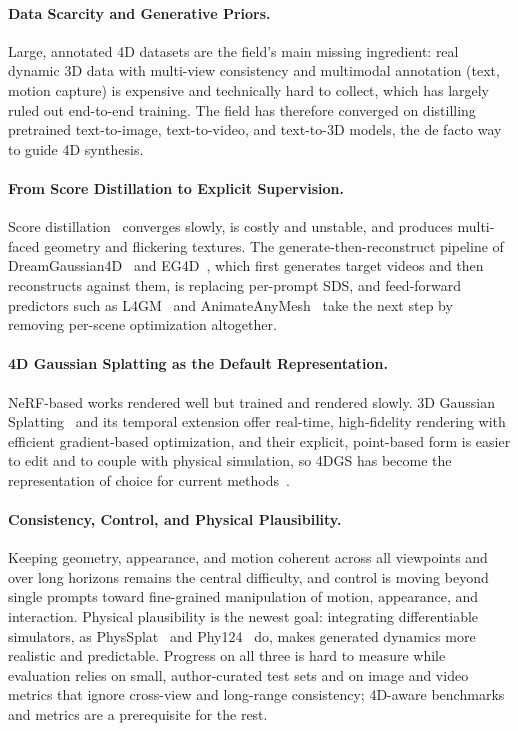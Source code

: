 \paragraph{Data Scarcity and Generative Priors.}
Large, annotated 4D datasets are the field's main missing ingredient: real dynamic 3D data with multi-view consistency and multimodal annotation (text, motion capture) is expensive and technically hard to collect, which has largely ruled out end-to-end training. The field has therefore converged on distilling pretrained text-to-image, text-to-video, and text-to-3D models, the de facto way to guide 4D synthesis.

\paragraph{From Score Distillation to Explicit Supervision.}
Score distillation~\cite{poole2022dreamfusion} converges slowly, is costly and unstable, and produces multi-faced geometry and flickering textures. The generate-then-reconstruct pipeline of DreamGaussian4D~\cite{ren2023dreamgaussian4d} and EG4D~\cite{sun2024eg4d}, which first generates target videos and then reconstructs against them, is replacing per-prompt SDS, and feed-forward predictors such as L4GM~\cite{ren2024l4gm} and AnimateAnyMesh~\cite{wu2025animateanymesh} take the next step by removing per-scene optimization altogether.

\paragraph{4D Gaussian Splatting as the Default Representation.}
NeRF-based works rendered well but trained and rendered slowly. 3D Gaussian Splatting~\cite{kerbl20233d} and its temporal extension offer real-time, high-fidelity rendering with efficient gradient-based optimization, and their explicit, point-based form is easier to edit and to couple with physical simulation, so 4DGS has become the representation of choice for current methods~\cite{wu20244d, ren2023dreamgaussian4d, ling2024align}.

\paragraph{Consistency, Control, and Physical Plausibility.}
Keeping geometry, appearance, and motion coherent across all viewpoints and over long horizons remains the central difficulty, and control is moving beyond single prompts toward fine-grained manipulation of motion, appearance, and interaction. Physical plausibility is the newest goal: integrating differentiable simulators, as PhysSplat~\cite{zhao2024efficient} and Phy124~\cite{lin2024phy124} do, makes generated dynamics more realistic and predictable. Progress on all three is hard to measure while evaluation relies on small, author-curated test sets and on image and video metrics that ignore cross-view and long-range consistency; 4D-aware benchmarks and metrics are a prerequisite for the rest.
